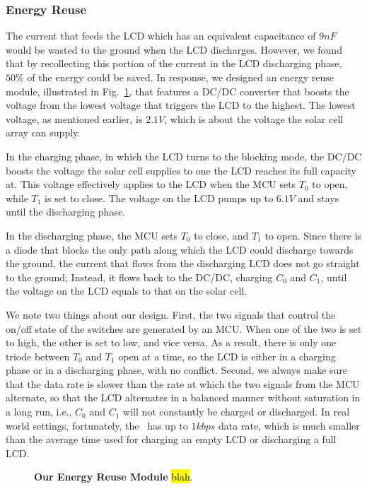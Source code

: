 \subsubsection{Energy Reuse}
The current that feeds the LCD which has an equivalent capacitance of $9nF$ would be wasted to the ground when the LCD discharges. However, we found that by recollecting this portion of the current in the LCD discharging phase, $50\%$ of the energy could be saved. In response, we designed an energy reuse module, illustrated in Fig.~\ref{fig:energyreuse}, that features a DC/DC converter that boosts the voltage from the lowest voltage that triggers the LCD to the highest. The lowest voltage, as mentioned earlier, is $2.1V$, which is about the voltage the solar cell array can supply. 

In the charging phase, in which the LCD turns to the blocking mode, the DC/DC boosts the voltage the solar cell supplies to one the LCD reaches its full capacity at. This voltage effectively applies to the LCD when the MCU sets $T_0$ to open, while $T_1$ is set to close. The voltage on the LCD pumps up to $6.1V$ and stays until the discharging phase.

In the discharging phase, the MCU sets $T_0$ to close, and $T_1$ to open. Since there is a diode that blocks the only path along which the LCD could discharge towards the ground, the current that flows from the discharging LCD does not go straight to the ground; Instead, it flows back to the DC/DC, charging $C_0$ and $C_1$, until the voltage on the LCD equals to that on the solar cell. 

We note two things about our design. First, the two signals that control the on/off state of the switches are generated by an MCU. When one of the two is set to high, the other is set to low, and vice versa, As a result, there is only one triode between $T_0$ and $T_1$ open at a time, so the LCD is either in a charging phase or in a discharging phase, with no conflict. Second, we always make sure that the data rate is slower than the rate at which the two signals from the MCU alternate, so that the LCD alternates in a balanced manner without saturation in a long run, i.e., $C_0$ and $C_1$ will not constantly be charged or discharged. In real world settings, fortunately, the \vitag\ has up to $1kbps$ data rate, which is much smaller than the average time used for charging an empty LCD or discharging a full LCD.

\begin{figure}[!t]
\vskip -0.03in
  \centering
      {
      }
\caption{{\bf Our Energy Reuse Module} \hl{blah}.}
\label{fig:energyreuse}
\vskip -0.05in
\end{figure}





